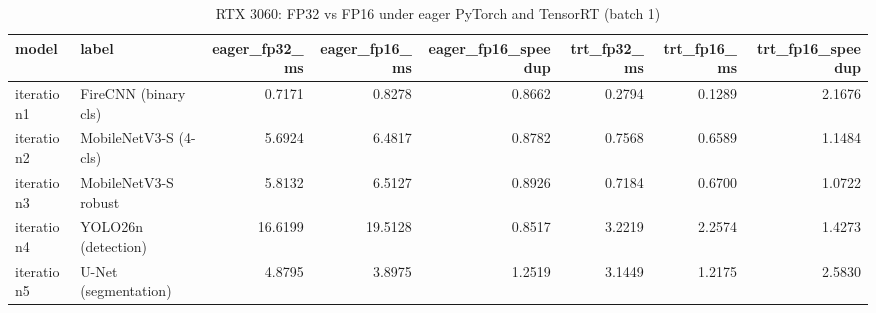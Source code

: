 \begin{table}
\caption{RTX 3060: FP32 vs FP16 under eager PyTorch and TensorRT (batch 1)}
\begin{tabular}{llrrrrrr}
\toprule
model & label & eager\_fp32\_ms & eager\_fp16\_ms & eager\_fp16\_speedup & trt\_fp32\_ms & trt\_fp16\_ms & trt\_fp16\_speedup \\
\midrule
iteration1 & FireCNN (binary cls) & 0.7171 & 0.8278 & 0.8662 & 0.2794 & 0.1289 & 2.1676 \\
iteration2 & MobileNetV3-S (4-cls) & 5.6924 & 6.4817 & 0.8782 & 0.7568 & 0.6589 & 1.1484 \\
iteration3 & MobileNetV3-S robust & 5.8132 & 6.5127 & 0.8926 & 0.7184 & 0.6700 & 1.0722 \\
iteration4 & YOLO26n (detection) & 16.6199 & 19.5128 & 0.8517 & 3.2219 & 2.2574 & 1.4273 \\
iteration5 & U-Net (segmentation) & 4.8795 & 3.8975 & 1.2519 & 3.1449 & 1.2175 & 2.5830 \\
\bottomrule
\end{tabular}
\end{table}
